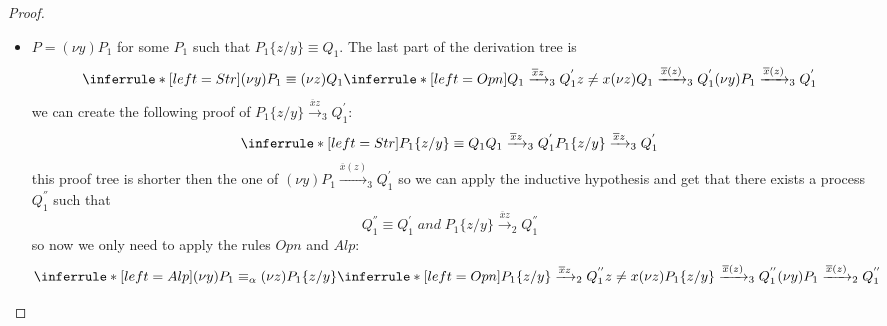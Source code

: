 \begin{theorem}
\begin{proof}
\begin{description}
\begin{itemize}
\begin{description}
\begin{itemize}
\[{				  Q_{1}\xrightarrow{\overline{x}z}_{3}Q_{1}^{'}
			      }{
				P_{1}\xrightarrow{\overline{x}z}_{3}Q_{1}^{'}
			      }
			\]
			then we apply the inductive hypothesis and get $P_{1}\xrightarrow{\overline{x}z}_{2}Q_{1}^{''}$ where $Q_{1}^{'}\equiv Q_{1}^{''}$. The last step is 
			\[
			  \inferrule* [left=Res]{
			      P_{1}\xrightarrow{\overline{x}z}_{2}Q_{1}^{''}
			    \\
			      z\neq x
			  }{
			    (\nu z)P_{1}\xrightarrow{\overline{x}z}_{2}Q_{1}^{''}
			  }
			\]
		      \item
			$P=(\nu y) P_{1}$ for some $P_{1}$ such that $P_{1}\{z/y\}\equiv Q_{1}$. The last part of the derivation tree is 
			\[
			  \inferrule* [left=Str]{
			      (\nu y) P_{1}\equiv (\nu z) Q_{1}
			    \\
			      \inferrule* [left=Opn]{
				  Q_{1} \xrightarrow{\overline{x}z}_{3} Q_{1}^{'}
				\\
				  z\neq x
			      }{
				(\nu z) Q_{1} \xrightarrow{\overline{x}(z)}_{3} Q_{1}^{'}
			      }
			  }{
			    (\nu y) P_{1} \xrightarrow{\overline{x}(z)}_{3} Q_{1}^{'}
			  }
			\]
			we can create the following proof of $P_{1}\{z/y\} \xrightarrow{\overline{x}z}_{3} Q_{1}^{'}$:
			\[
			  \inferrule* [left=Str]{
			      P_{1}\{z/y\}\equiv Q_{1}
			    \\
			      Q_{1} 
				\xrightarrow{\overline{x}z}_{3} 
				  Q_{1}^{'}
			  }{
			    P_{1}\{z/y\} 
			      \xrightarrow{\overline{x}z}_{3} 
				Q_{1}^{'}
			  }
			\]
			this proof tree is shorter then the one of $(\nu y) P_{1} \xrightarrow{\overline{x}(z)}_{3} Q_{1}^{'}$ so we can apply the inductive hypothesis and get that there exists a process $Q_{1}^{''}$ such that
			\[
			  Q_{1}^{''}\equiv Q_{1}^{'}\; and\;
			    P_{1}\{z/y\} 
			      \xrightarrow{\overline{x}z}_{2} 
				Q_{1}^{''} 
			\]
			so now we only need to apply the rules $Opn$ and $Alp$:
			\[
			  \inferrule* [left=Alp]{
			      (\nu y) P_{1}\equiv_{\alpha} (\nu z) P_{1}\{z/y\}
			    \\
			      \inferrule* [left=Opn]{
				  P_{1}\{z/y\} \xrightarrow{\overline{x}z}_{2} Q_{1}^{''}
				\\
				  z\neq x
			      }{
				(\nu z) P_{1}\{z/y\} \xrightarrow{\overline{x}(z)}_{3} Q_{1}^{''}
			      }
			  }{
			    (\nu y) P_{1} \xrightarrow{\overline{x}(z)}_{2} Q_{1}^{''}
			  }
			\]
		  \end{itemize}
		\end{description}
	    \end{itemize}	    
	\end{description}
  \end{proof}
\end{theorem}



